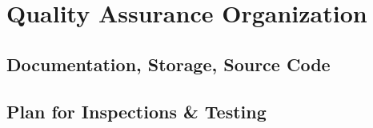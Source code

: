 \section{Quality Assurance Organization}

\subsection{Documentation, Storage, Source Code} \label{sec:documentation_storage_source_code}

\begin{comment}
    Documentation
        Kode
            Følge industri-standard dokumentasjon og kodestil for hvert kodespråk
            Kanksje generere dokumetasjonssider fra kodedokumentasjon
        Misc dokumenter
            
        Møter og enigheter
            Møtenotater/referat skal bli tatt av alle møter
            Alle viktige valg som blir gjort etter diskusjoner blir notert
        
    Storage ?
        Skylagring i de SaaS vi bruker (Overleaf, Teamgantt, Traggo(?), fler) med backup i git for latex dokumenter og annet fil-basert data, google drive for dokumenter. I tilegg til lokal lagring på hvert medlems pc

    Source code
        Følge industri-standard dokumentasjon og kodestil for hvert kodespråk
        Kanksje generere dokumetasjonssider fra kodedokumentasjon
        
\end{comment}

\subsection{Plan for Inspections \& Testing}\label{sec:plan_for_inspections_&_testing}

\begin{comment}
    GitOps som et sentralt konsept
    Bruke CICD Pipelines for å automatisere så mye som mulig
    f.eks. statiske kodesjekker og inspections, unittester og integrasjonstester
    også deployment for å kunne ha manuelle inspeksjoner og tester during development
    Plan om usertesting etter vi har MVP på plass midt i mars, jobbe utifra kravspesifikasjon og tilbakemelding fra productowner fram til det
    
\end{comment}

